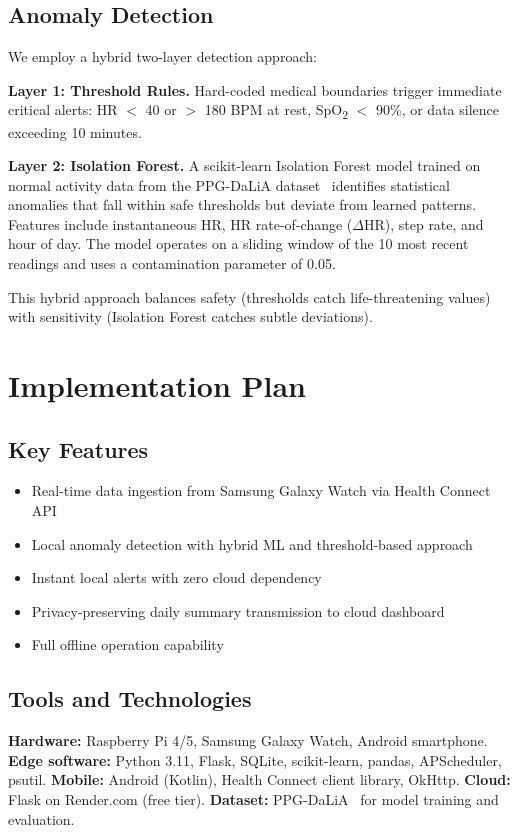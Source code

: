 \documentclass[conference]{IEEEtran}
\begin{document}
\subsection{Anomaly Detection}

We employ a hybrid two-layer detection approach:

\textbf{Layer 1: Threshold Rules.} Hard-coded medical boundaries trigger immediate critical alerts: HR $<$ 40 or $>$ 180 BPM at rest, SpO\textsubscript{2} $<$ 90\%, or data silence exceeding 10 minutes.

\textbf{Layer 2: Isolation Forest.} A scikit-learn Isolation Forest model trained on normal activity data from the PPG-DaLiA dataset~\cite{ppg_dalia} identifies statistical anomalies that fall within safe thresholds but deviate from learned patterns. Features include instantaneous HR, HR rate-of-change ($\Delta$HR), step rate, and hour of day. The model operates on a sliding window of the 10 most recent readings and uses a contamination parameter of 0.05.

This hybrid approach balances safety (thresholds catch life-threatening values) with sensitivity (Isolation Forest catches subtle deviations).

\section{Implementation Plan}

\subsection{Key Features}
\begin{itemize}
    \item Real-time data ingestion from Samsung Galaxy Watch via Health Connect API
    \item Local anomaly detection with hybrid ML and threshold-based approach
    \item Instant local alerts with zero cloud dependency
    \item Privacy-preserving daily summary transmission to cloud dashboard
    \item Full offline operation capability
\end{itemize}

\subsection{Tools and Technologies}
\textbf{Hardware:} Raspberry Pi 4/5, Samsung Galaxy Watch, Android smartphone.
\textbf{Edge software:} Python 3.11, Flask, SQLite, scikit-learn, pandas, APScheduler, psutil.
\textbf{Mobile:} Android (Kotlin), Health Connect client library, OkHttp.
\textbf{Cloud:} Flask on Render.com (free tier).
\textbf{Dataset:} PPG-DaLiA~\cite{ppg_dalia} for model training and evaluation.
\end{document}
